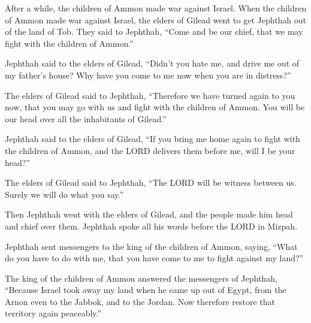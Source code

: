  After a while, the children of Ammon made war against
Israel.  When the children of Ammon made war against Israel,
the elders of Gilead went to get Jephthah out of the land of Tob.
 They said to Jephthah, ``Come and be our chief, that we may
fight with the children of Ammon.''

 Jephthah said to the elders of Gilead, ``Didn't you hate
me, and drive me out of my father's house? Why have you come to me now
when you are in distress?''

 The elders of Gilead said to Jephthah, ``Therefore we have
turned again to you now, that you may go with us and fight with the
children of Ammon. You will be our head over all the inhabitants of
Gilead.''

 Jephthah said to the elders of Gilead, ``If you bring me
home again to fight with the children of Ammon, and the LORD delivers
them before me, will I be your head?''

 The elders of Gilead said to Jephthah, ``The LORD will be
witness between us. Surely we will do what you say.''

 Then Jephthah went with the elders of Gilead, and the
people made him head and chief over them. Jephthah spoke all his words
before the LORD in Mizpah.

 Jephthah sent messengers to the king of the children of
Ammon, saying, ``What do you have to do with me, that you have come to
me to fight against my land?''

 The king of the children of Ammon answered the messengers
of Jephthah, ``Because Israel took away my land when he came up out of
Egypt, from the Arnon even to the Jabbok, and to the Jordan. Now
therefore restore that territory again peaceably.''

